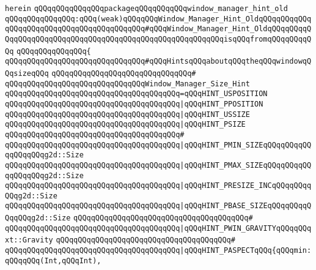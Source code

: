 \verb|herein|\newline
\newline
\newline
\verb|qQQqqQQqqQQqqQQqpackageqQQqqQQqqQQqwindow_manager_hint_old|\newline
\verb|qQQqqQQqqQQqqQQq:qQQq(weak)qQQqqQQqWindow_Manager_Hint_OldqQQqqQQqqQQqqQQqqQQqqQQqqQQqqQQqqQQqqQQqqQQq#qQQqWindow_Manager_Hint_OldqQQqqQQqqQQqqQQqqQQqqQQqqQQqqQQqqQQqqQQqqQQqqQQqqQQqqQQqqQQqisqQQqfromqQQqqQQqqQQq|\newline
\verb|qQQqqQQqqQQqqQQq{|\newline
\verb|qQQqqQQqqQQqqQQqqQQqqQQqqQQqqQQq#qQQqHintsqQQqaboutqQQqtheqQQqwindowqQQqsizeqQQq|\newline
\verb|qQQqqQQqqQQqqQQqqQQqqQQqqQQqqQQq#|\newline
\verb|qQQqqQQqqQQqqQQqqQQqqQQqqQQqqQQqWindow_Manager_Size_Hint|\newline
\verb|qQQqqQQqqQQqqQQqqQQqqQQqqQQqqQQqqQQqqQQq=qQQqHINT_USPOSITION|\newline
\verb|qQQqqQQqqQQqqQQqqQQqqQQqqQQqqQQqqQQqqQQq|\verb#|qQQqHINT_PPOSITION#\newline
\verb|qQQqqQQqqQQqqQQqqQQqqQQqqQQqqQQqqQQqqQQq|\verb#|qQQqHINT_USSIZE#\newline
\verb|qQQqqQQqqQQqqQQqqQQqqQQqqQQqqQQqqQQqqQQq|\verb#|qQQqHINT_PSIZE#\newline
\verb|qQQqqQQqqQQqqQQqqQQqqQQqqQQqqQQqqQQqqQQq#|\newline
\verb|qQQqqQQqqQQqqQQqqQQqqQQqqQQqqQQqqQQqqQQq|\verb#|qQQqHINT_PMIN_SIZEqQQqqQQqqQQqqQQqqQQqg2d::Size#\newline
\verb|qQQqqQQqqQQqqQQqqQQqqQQqqQQqqQQqqQQqqQQq|\verb#|qQQqHINT_PMAX_SIZEqQQqqQQqqQQqqQQqqQQqg2d::Size#\newline
\verb|qQQqqQQqqQQqqQQqqQQqqQQqqQQqqQQqqQQqqQQq|\verb#|qQQqHINT_PRESIZE_INCqQQqqQQqqQQqg2d::Size#\newline
\verb|qQQqqQQqqQQqqQQqqQQqqQQqqQQqqQQqqQQqqQQq|\verb#|qQQqHINT_PBASE_SIZEqQQqqQQqqQQqqQQqg2d::Size#\newline
\verb|qQQqqQQqqQQqqQQqqQQqqQQqqQQqqQQqqQQqqQQq#|\newline
\verb|qQQqqQQqqQQqqQQqqQQqqQQqqQQqqQQqqQQqqQQq|\verb#|qQQqHINT_PWIN_GRAVITYqQQqqQQqxt::Gravity#\newline
\verb|qQQqqQQqqQQqqQQqqQQqqQQqqQQqqQQqqQQqqQQq#|\newline
\verb|qQQqqQQqqQQqqQQqqQQqqQQqqQQqqQQqqQQqqQQq|\verb#|qQQqHINT_PASPECTqQQq{qQQqmin:qQQqqQQq(Int,qQQqInt),#\newline
